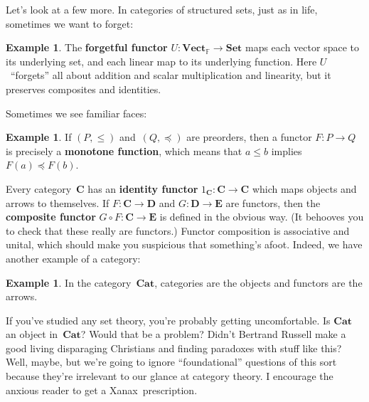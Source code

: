 \documentclass[letterpaper,12pt]{article}
\newcommand{\F}{\mathbb{F}}
\newcommand{\after}{\circ}
\newcommand{\cat}[1]{\mathbf{#1}}
\newcommand{\Cat}{\cat{Cat}}
\newcommand{\Set}{\cat{Set}}
\newcommand{\Vect}{\cat{Vect}}
\newcommand{\textdefn}{\textbf}
\theoremstyle{definition}
\newtheorem{exmp}[equation]{Example}
\theoremstyle{plain}
\numberwithin{equation}{section}
\begin{document}
\noindent Let's look at a few more. In categories of structured sets, just as in life, sometimes we want to forget:
\begin{exmp}
The \textdefn{forgetful functor} \(U:\Vect_{\F}\to\Set\) maps each vector space to its underlying set, and each linear map to its underlying function. Here \(U\)~``forgets'' all about addition and scalar multiplication and linearity, but it preserves composites and identities.
\end{exmp}

\noindent Sometimes we see familiar faces:
\begin{exmp}
If \((P,\le)\) and~\((Q,\preccurlyeq)\) are preorders, then a functor \(F:P\to Q\) is precisely a \textdefn{monotone function}, which means that \(a\le b\) implies \(F(a)\preccurlyeq F(b)\).
\end{exmp}

\noindent Every category~\(\cat{C}\) has an \textdefn{identity functor} \(1_{\cat{C}}:\cat{C}\to\cat{C}\) which maps objects and arrows to themselves. If \(F:\cat{C}\to\cat{D}\) and \(G:\cat{D}\to\cat{E}\) are functors, then the \textdefn{composite functor} \(G\after F:\cat{C}\to\cat{E}\) is defined in the obvious way. (It behooves you to check that these really are functors.) Functor composition is associative and unital, which should make you suspicious that something's afoot. Indeed, we have another example of a category:
\begin{exmp}
In the category~\(\Cat\), categories are the objects and functors are the arrows.
\end{exmp}
\noindent If you've studied any set theory, you're probably getting uncomfortable. Is \(\cat{Cat}\) an object in~\(\cat{Cat}\)? Would that be a problem? Didn't Bertrand Russell make a good living disparaging Christians and finding paradoxes with stuff like this? Well, maybe, but we're going to ignore ``foundational'' questions of this sort because they're irrelevant to our glance at category theory. I encourage the anxious reader to get a Xanax\texttrademark\ prescription.

\end{document}
